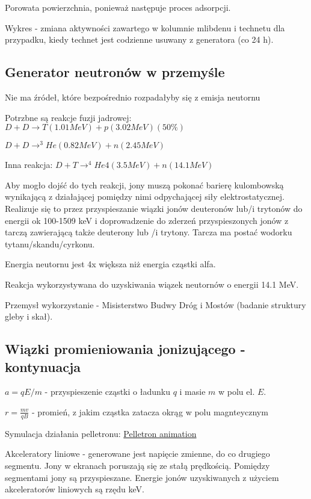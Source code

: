 \documentclass{article}
\begin{document}
Porowata powierzchnia, ponieważ następuje proces adsorpcji.

Wykres - zmiana aktywności zawartego w kolumnie mlibdenu i technetu dla przypadku, kiedy technet jest codzienne usuwany z generatora (co 24 h).

\subsection{Generator neutronów w przemyśle}

Nie ma źródeł, które bezpośrednio rozpadałyby się z emisja neutornu

Potrzbne są reakcje fuzji jadrowej:
$D+D \rightarrow T (1.01 MeV) + p (3.02 MeV) (50\%)$

$D+D \rightarrow ^3He (0.82 MeV) + n (2.45 MeV)$

Inna reakcja:
$D+T \rightarrow ^4He4 (3.5 MeV) + n (14.1 MeV)$

Aby mogło dojść do tych reakcji, jony muszą pokonać barierę kulombowską wynikającą z działającej pomiędzy nimi odpychającej siły elektrostatycznej. Realizuje się to przez przyspieszanie wiązki jonów deuteronów lub\slash i trytonów do energii ok 100-1509 keV i doprowadzenie do zderzeń przyspieszonych jonów z tarczą zawierającą także deuterony lub \slash i trytony. Tarcza ma postać wodorku tytanu\slash skandu\slash cyrkonu.

Energia neutornu jest 4x większa niż energia cząstki alfa.

Reakcja wykorzystywana do uzyskiwania wiązek neutornów o energii 14.1 MeV.

Przemysł wykorzystanie - Misisterstwo Budwy Dróg i Mostów (badanie struktury gleby i skał).

\subsection{Wiązki promieniowania jonizującego - kontynuacja}

$a = qE / m$ - przyspieszenie cząstki o ładunku $q$ i masie $m$ w polu el. $E$.

$r = \frac{mv}{qB}$ - promień, z jakim cząstka zatacza okrąg w polu magnteycznym

Symulacja działania pelletronu: \href{https://www.pelletron.com/wp-content/uploads/2018/12/pelletron-animation.gif}{Pelletron animation}

Akceleratory liniowe - generowane jest napięcie zmienne, do co drugiego segmentu. Jony w ekranach poruszają się ze stałą prędkością. Pomiędzy segmentami jony są przyspieszane. Energie jonów uzyskiwanych z użyciem akceleratorów liniowych są rzędu keV.
\end{document}
